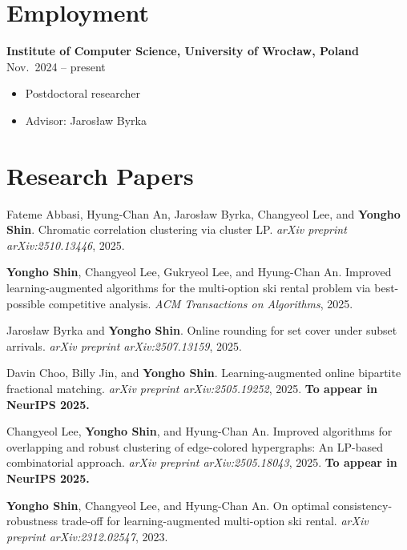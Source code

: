 \documentclass{article}
\newcommand{\killinitspace}{-0.7em}
\begin{document}
\section{Employment}
\textbf{Institute of Computer Science, University of Wrocław, Poland} \hfill Nov.~2024 -- present
\vspace{\killinitspace}
\begin{itemize}
\item Postdoctoral researcher
\item Advisor: Jarosław Byrka
\end{itemize}

\section{Research Papers}
Fateme Abbasi, Hyung-Chan An, Jaros{\l}aw Byrka, Changyeol Lee, and \textbf{Yongho Shin}. Chromatic correlation clustering via cluster LP. \emph{arXiv preprint arXiv:2510.13446}, 2025. 

\textbf{Yongho Shin}, Changyeol Lee, Gukryeol Lee, and Hyung-Chan An. Improved learning-augmented algorithms for the multi-option ski rental problem via best-possible competitive analysis. \emph{ACM Transactions on Algorithms}, 2025.

Jaros{\l}aw Byrka and \textbf{Yongho Shin}. Online rounding for set cover under subset arrivals. \emph{arXiv preprint arXiv:2507.13159}, 2025.

Davin Choo, Billy Jin, and \textbf{Yongho Shin}. Learning-augmented online bipartite fractional matching. \emph{arXiv preprint arXiv:2505.19252}, 2025. \textbf{To appear in NeurIPS 2025.}

Changyeol Lee, \textbf{Yongho Shin}, and Hyung-Chan An. Improved algorithms for overlapping and robust clustering of edge-colored hypergraphs: An LP-based combinatorial approach. \emph{arXiv preprint arXiv:2505.18043}, 2025. \textbf{To appear in NeurIPS 2025.}

\textbf{Yongho Shin}, Changyeol Lee, and Hyung-Chan An. On optimal consistency-robustness trade-off for learning-augmented multi-option ski rental. \emph{arXiv preprint arXiv:2312.02547}, 2023.
\end{document}
